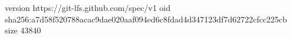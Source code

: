 version https://git-lfs.github.com/spec/v1
oid sha256:a7d58f520788acac9dae020aaf094ed6c8fdad4d347123df7d62722cfcc225cb
size 43840
